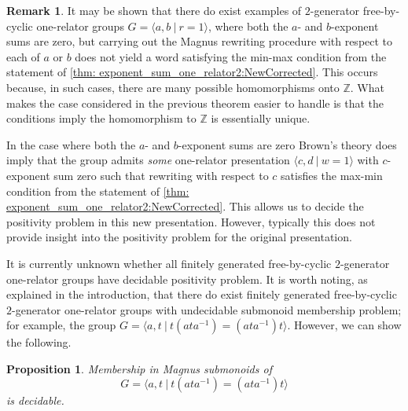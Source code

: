 \documentclass[11pt]{amsart}
\newcommand{\Gpres}[2]{\bigl\langle #1\:|\:#2 \bigr\rangle}
\theoremstyle{plain}
\newtheorem{prop}[theorem]{Proposition}
\theoremstyle{definition}
\newtheorem{remark}[theorem]{Remark}
\begin{document}
\begin{remark}\label{rmk:maxmin} 
It may be shown that there do exist examples 
of $2$-generator free-by-cyclic one-relator groups 
$G = \Gpres{a,b}{r = 1}$, where both the $a$- and $b$-exponent sums are zero, but
carrying out the Magnus rewriting procedure 
with respect to each of $a$ or $b$ does not yield a word satisfying the min-max condition from the statement of 
\cref{thm: exponent_sum_one_relator2:NewCorrected}. 
This occurs because, in such cases, there are many possible homomorphisms onto $\mathbb{Z}$.
What makes the case considered in the previous theorem easier to handle is that the conditions imply the homomorphism to $\mathbb{Z}$ is essentially unique.

In the case where both the $a$- and $b$-exponent sums are zero
Brown's theory does imply that the group admits \emph{some} one-relator presentation $\Gpres{c,d}{w=1}$ with $c$-exponent sum zero such that rewriting with respect to $c$ satisfies the max-min condition from the statement of \cref{thm: exponent_sum_one_relator2:NewCorrected}. This allows us to decide the positivity problem in this new presentation. However, typically this does not provide insight into the positivity problem for the original presentation.            
\end{remark}



It is currently unknown whether all finitely generated free-by-cyclic $2$-generator one-relator groups have decidable positivity problem. 
It is worth noting, as explained in the introduction, that there do exist finitely generated free-by-cyclic $2$-generator one-relator groups with undecidable submonoid membership problem; for example, the group
$
G = \Gpres{a,t}{t(ata^{-1}) = (ata^{-1})t}.
$
However, we can show the following. 


\begin{prop}\label{prop:BurnsGroup} 
Membership in Magnus submonoids of 
\[
G = \Gpres{a,t}{t(ata^{-1}) = (ata^{-1})t}
\]
is decidable.
\end{prop}
\end{document}
